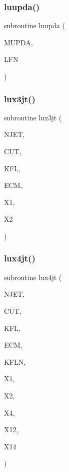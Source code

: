 \subsubsection{\texorpdfstring{luupda()}{luupda()}}
{\footnotesize\ttfamily subroutine luupda (\begin{DoxyParamCaption}\item[{}]{M\+U\+P\+DA,  }\item[{}]{L\+FN }\end{DoxyParamCaption})}

\mbox{\label{jetset7409_8f_ac4e81e489406df9e1371c725c7e33257}} 
\subsubsection{\texorpdfstring{lux3jt()}{lux3jt()}}
{\footnotesize\ttfamily subroutine lux3jt (\begin{DoxyParamCaption}\item[{}]{N\+J\+ET,  }\item[{}]{C\+UT,  }\item[{}]{K\+FL,  }\item[{}]{E\+CM,  }\item[{}]{X1,  }\item[{}]{X2 }\end{DoxyParamCaption})}

\mbox{\label{jetset7409_8f_a4ec86c629d8ef040973034155385dd09}} 
\subsubsection{\texorpdfstring{lux4jt()}{lux4jt()}}
{\footnotesize\ttfamily subroutine lux4jt (\begin{DoxyParamCaption}\item[{}]{N\+J\+ET,  }\item[{}]{C\+UT,  }\item[{}]{K\+FL,  }\item[{}]{E\+CM,  }\item[{}]{K\+F\+LN,  }\item[{}]{X1,  }\item[{}]{X2,  }\item[{}]{X4,  }\item[{}]{X12,  }\item[{}]{X14 }\end{DoxyParamCaption})}

